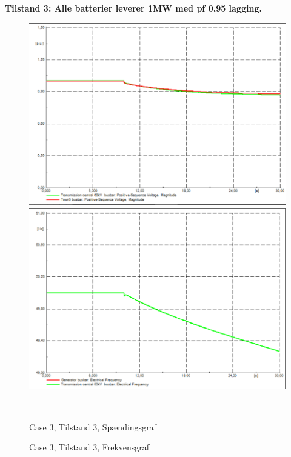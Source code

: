 \textbf{Tilstand 3: Alle batterier leverer 1MW med pf 0,95 lagging.}
\begin{figure}[H]
	\centering
	\begin{minipage}[b]{0.48\textwidth}
		\centering
		\includegraphics[width=1.00\textwidth]{figurer/LargeDisturbance/Voltage3} %
	\end{minipage}
	\hfill
	\begin{minipage}[b]{0.48\textwidth}
		\centering
		\includegraphics[width=1.00\textwidth]{figurer/LargeDisturbance/Freq3} %
	\end{minipage}
	\\ %
	\begin{minipage}[t]{0.48\textwidth}
		\caption{Case 3, Tilstand 3, Spændingsgraf} %
		\label{fig:C3T3V}
	\end{minipage}
	\hfill
	\begin{minipage}[t]{0.48\textwidth}
		\caption{Case 3, Tilstand 3, Frekvensgraf} %
		\label{fig:C3T3F}
	\end{minipage}
\end{figure}

